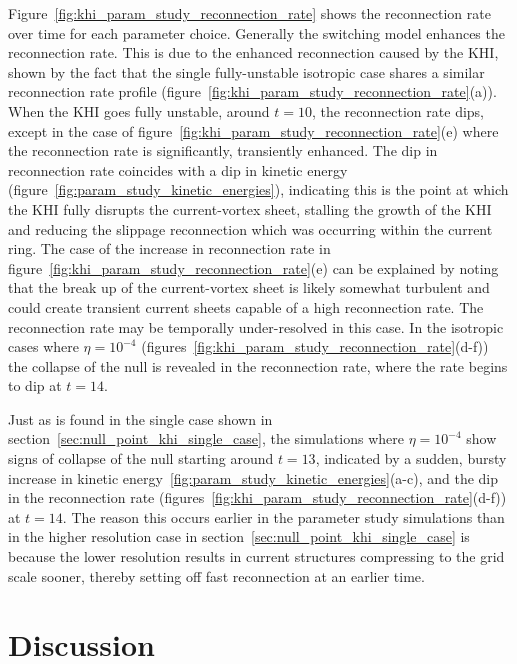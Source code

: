 Figure~\ref{fig:khi_param_study_reconnection_rate} shows the reconnection rate over time for each parameter choice. Generally the switching model enhances the reconnection rate. This is due to the enhanced reconnection caused by the KHI, shown by the fact that the single fully-unstable isotropic case shares a similar reconnection rate profile (figure~\ref{fig:khi_param_study_reconnection_rate}(a)). When the KHI goes fully unstable, around $t=10$, the reconnection rate dips, except in the case of figure~\ref{fig:khi_param_study_reconnection_rate}(e) where the reconnection rate is significantly, transiently enhanced. The dip in reconnection rate coincides with a dip in kinetic energy (figure~\ref{fig:param_study_kinetic_energies}), indicating this is the point at which the KHI fully disrupts the current-vortex sheet, stalling the growth of the KHI and reducing the slippage reconnection which was occurring within the current ring. The case of the increase in reconnection rate in figure~\ref{fig:khi_param_study_reconnection_rate}(e) can be explained by noting that the break up of the current-vortex sheet is likely somewhat turbulent and could create transient current sheets capable of a high reconnection rate. The reconnection rate may be temporally under-resolved in this case. In the isotropic cases where $\eta=10^{-4}$ (figures~\ref{fig:khi_param_study_reconnection_rate}(d-f)) the collapse of the null is revealed in the reconnection rate, where the rate begins to dip at $t=14$.

Just as is found in the single case shown in section~\ref{sec:null_point_khi_single_case}, the simulations where $\eta = 10^{-4}$ show signs of collapse of the null starting around $t=13$, indicated by a sudden, bursty increase in kinetic energy~\ref{fig:param_study_kinetic_energies}(a-c), and the dip in the reconnection rate (figures~\ref{fig:khi_param_study_reconnection_rate}(d-f)) at $t=14$. The reason this occurs earlier in the parameter study simulations than in the higher resolution case in section~\ref{sec:null_point_khi_single_case} is because the lower resolution results in current structures compressing to the grid scale sooner, thereby setting off fast reconnection at an earlier time. 


\section{Discussion}
\label{sec:khi_discussion}

